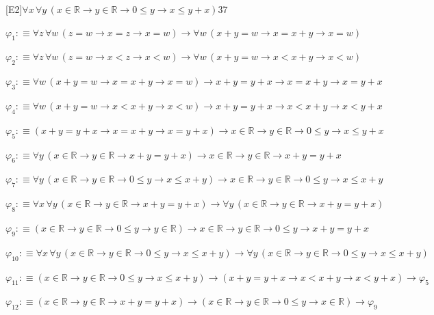 \begin{fullproof}{[E2]}{$\forall x\,\forall y\,(x \in \mathbb{R} \to y \in \mathbb{R} \to 0 \leq y \to x \leq y + x)$}{37}
\begin{ptree}
\noLine
{}
\end{ptree}
\begin{abbrevlist}
\item $\varphi_{1} :\equiv \forall z\,\forall w\,(z = w \to x = z \to x = w) \to \forall w\,(x + y = w \to x = x + y \to x = w)$
\item $\varphi_{2} :\equiv \forall z\,\forall w\,(z = w \to x < z \to x < w) \to \forall w\,(x + y = w \to x < x + y \to x < w)$
\item $\varphi_{3} :\equiv \forall w\,(x + y = w \to x = x + y \to x = w) \to x + y = y + x \to x = x + y \to x = y + x$
\item $\varphi_{4} :\equiv \forall w\,(x + y = w \to x < x + y \to x < w) \to x + y = y + x \to x < x + y \to x < y + x$
\item $\varphi_{5} :\equiv (x + y = y + x \to x = x + y \to x = y + x) \to x \in \mathbb{R} \to y \in \mathbb{R} \to 0 \leq y \to x \leq y + x$
\item $\varphi_{6} :\equiv \forall y\,(x \in \mathbb{R} \to y \in \mathbb{R} \to x + y = y + x) \to x \in \mathbb{R} \to y \in \mathbb{R} \to x + y = y + x$
\item $\varphi_{7} :\equiv \forall y\,(x \in \mathbb{R} \to y \in \mathbb{R} \to 0 \leq y \to x \leq x + y) \to x \in \mathbb{R} \to y \in \mathbb{R} \to 0 \leq y \to x \leq x + y$
\item $\varphi_{8} :\equiv \forall x\,\forall y\,(x \in \mathbb{R} \to y \in \mathbb{R} \to x + y = y + x) \to \forall y\,(x \in \mathbb{R} \to y \in \mathbb{R} \to x + y = y + x)$
\item $\varphi_{9} :\equiv (x \in \mathbb{R} \to y \in \mathbb{R} \to 0 \leq y \to y \in \mathbb{R}) \to x \in \mathbb{R} \to y \in \mathbb{R} \to 0 \leq y \to x + y = y + x$
\item $\varphi_{10} :\equiv \forall x\,\forall y\,(x \in \mathbb{R} \to y \in \mathbb{R} \to 0 \leq y \to x \leq x + y) \to \forall y\,(x \in \mathbb{R} \to y \in \mathbb{R} \to 0 \leq y \to x \leq x + y)$
\item $\varphi_{11} :\equiv (x \in \mathbb{R} \to y \in \mathbb{R} \to 0 \leq y \to x \leq x + y) \to (x + y = y + x \to x < x + y \to x < y + x) \to \varphi_{5}$
\item $\varphi_{12} :\equiv (x \in \mathbb{R} \to y \in \mathbb{R} \to x + y = y + x) \to (x \in \mathbb{R} \to y \in \mathbb{R} \to 0 \leq y \to x \in \mathbb{R}) \to \varphi_{9}$
\end{abbrevlist}
\end{fullproof}
